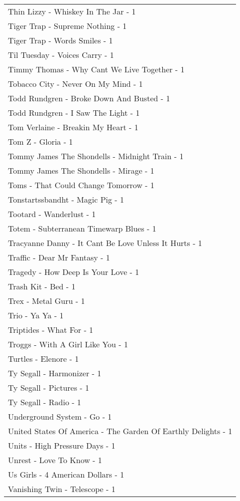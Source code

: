 \documentclass[
]{article}
\begin{document}
\begin{longtable}{l}
Thin Lizzy - Whiskey In The Jar - 1 \\ 
Tiger Trap - Supreme Nothing - 1 \\ 
Tiger Trap - Words Smiles - 1 \\ 
Til Tuesday - Voices Carry - 1 \\ 
Timmy Thomas - Why Cant We Live Together - 1 \\ 
Tobacco City - Never On My Mind - 1 \\ 
Todd Rundgren - Broke Down And Busted - 1 \\ 
Todd Rundgren - I Saw The Light - 1 \\ 
Tom Verlaine - Breakin My Heart - 1 \\ 
Tom Z - Gloria - 1 \\ 
Tommy James The Shondells - Midnight Train - 1 \\ 
Tommy James The Shondells - Mirage - 1 \\ 
Toms - That Could Change Tomorrow - 1 \\ 
Tonstartssbandht - Magic Pig - 1 \\ 
Tootard - Wanderlust - 1 \\ 
Totem - Subterranean Timewarp Blues - 1 \\ 
Tracyanne Danny - It Cant Be Love Unless It Hurts - 1 \\ 
Traffic - Dear Mr Fantasy - 1 \\ 
Tragedy - How Deep Is Your Love - 1 \\ 
Trash Kit - Bed - 1 \\ 
Trex - Metal Guru - 1 \\ 
Trio - Ya Ya - 1 \\ 
Triptides - What For - 1 \\ 
Troggs - With A Girl Like You - 1 \\ 
Turtles - Elenore - 1 \\ 
Ty Segall - Harmonizer - 1 \\ 
Ty Segall - Pictures - 1 \\ 
Ty Segall - Radio - 1 \\ 
Underground System - Go - 1 \\ 
United States Of America - The Garden Of Earthly Delights - 1 \\ 
Units - High Pressure Days - 1 \\ 
Unrest - Love To Know - 1 \\ 
Us Girls - 4 American Dollars - 1 \\ 
Vanishing Twin - Telescope - 1 \\ 

\end{longtable}
\end{document}
